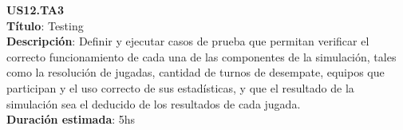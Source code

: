 \begin{tcolorbox}
\textbf{US12.TA3} \\
\textbf{Título}: Testing\\
\textbf{Descripción}: Definir y ejecutar casos de prueba que permitan verificar el correcto funcionamiento de cada una de las componentes de la simulación, tales como la resolución de jugadas, cantidad de turnos de desempate, equipos que participan y el uso correcto de sus estadísticas, y que el resultado de la simulación sea el deducido de los resultados de cada jugada.\\
\textbf{Duración estimada}: 5hs
\end{tcolorbox}
\vspace{10pt}

